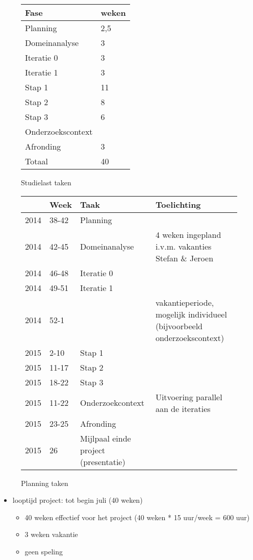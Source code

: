 \begin{figure}[h]
\begin{tabular}{ll}\hline
{\bf Fase}    & {\bf weken}\\\hline
Planning             & 2,5 \\
Domeinanalyse        & 3 \\
\hline
Iteratie 0           & 3 \\
Iteratie 1           & 3 \\
Stap 1				& 11 \\
Stap 2				& 8 \\
Stap 3				& 6 \\
\hline
Onderzoekscontext     &	 \\
Afronding	     & 3 \\
\hline
Totaal               & 40 \\
\end{tabular}
\caption{Studielast taken}
\end{figure}

\begin{figure}[h]
\begin{tabular}{lllp{7cm}}\hline
{} & {\bf Week}    & {\bf Taak}  & {\bf Toelichting}\\\hline
2014 & 38-42         & Planning    \\
2014 & 42-45         & Domeinanalyse & 4 weken ingepland i.v.m. vakanties Stefan \& Jeroen \\
2014 & 46-48         & Iteratie 0    \\
2014 & 49-51         & Iteratie 1    \\
2014 & 52-1          &               & vakantieperiode, mogelijk
				individueel (bijvoorbeeld onderzoekscontext) \\
2015 & 2-10           & Stap 1    \\
2015 & 11-17           & Stap 2    \\
2015 & 18-22          & Stap 3    \\

2015 & 11-22          & Onderzoekcontext & Uitvoering parallel aan de iteraties \\
2015 & 23-25         & Afronding     \\

2015 & 26            & Mijlpaal einde project (presentatie)
\end{tabular}
\caption{Planning taken}
\end{figure}

\begin{itemize}
 \item looptijd project: tot begin juli (40 weken)
 \begin{itemize}
  \item 40 weken effectief voor het project  (40 weken * 15 uur/week = 600 uur)
  \item 3 weken vakantie
  \item geen speling
 \end{itemize}
\end{itemize}

